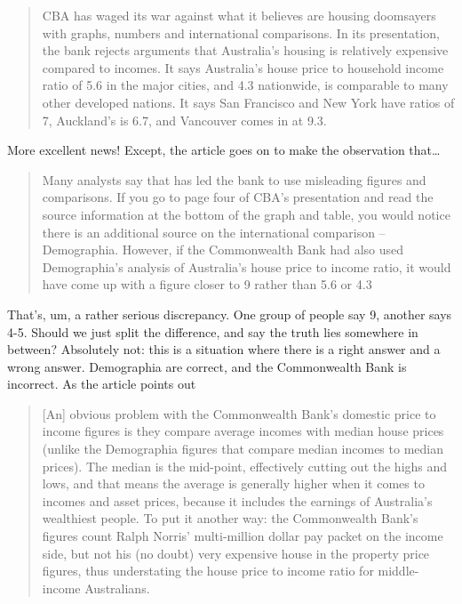 \documentclass[
]{book}
\begin{document}
\begin{quote}
CBA has waged its war against what it believes are housing doomsayers with graphs, numbers and international comparisons. In its presentation, the bank rejects arguments that Australia's housing is relatively expensive compared to incomes. It says Australia's house price to household income ratio of 5.6 in the major cities, and 4.3 nationwide, is comparable to many other developed nations. It says San Francisco and New York have ratios of 7, Auckland's is 6.7, and Vancouver comes in at 9.3.
\end{quote}

More excellent news! Except, the article goes on to make the observation that\ldots{}

\begin{quote}
Many analysts say that has led the bank to use misleading figures and comparisons. If you go to page four of CBA's presentation and read the source information at the bottom of the graph and table, you would notice there is an additional source on the international comparison -- Demographia. However, if the Commonwealth Bank had also used Demographia's analysis of Australia's house price to income ratio, it would have come up with a figure closer to 9 rather than 5.6 or 4.3
\end{quote}

That's, um, a rather serious discrepancy. One group of people say 9, another says 4-5. Should we just split the difference, and say the truth lies somewhere in between? Absolutely not: this is a situation where there is a right answer and a wrong answer. Demographia are correct, and the Commonwealth Bank is incorrect. As the article points out

\begin{quote}
{[}An{]} obvious problem with the Commonwealth Bank's domestic price to income figures is they compare average incomes with median house prices (unlike the Demographia figures that compare median incomes to median prices). The median is the mid-point, effectively cutting out the highs and lows, and that means the average is generally higher when it comes to incomes and asset prices, because it includes the earnings of Australia's wealthiest people. To put it another way: the Commonwealth Bank's figures count Ralph Norris' multi-million dollar pay packet on the income side, but not his (no doubt) very expensive house in the property price figures, thus understating the house price to income ratio for middle-income Australians.
\end{quote}
\end{document}
